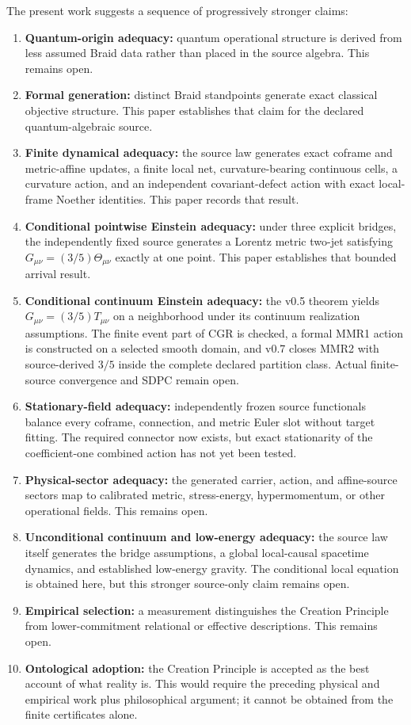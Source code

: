 \documentclass[11pt]{article}
\theoremstyle{definition}
\theoremstyle{remark}
\begin{document}
The present work suggests a sequence of progressively stronger claims:
\begin{enumerate}
\item \textbf{Quantum-origin adequacy:} quantum operational structure is derived from less assumed Braid data rather than placed in the source algebra. This remains open.
\item \textbf{Formal generation:} distinct Braid standpoints generate exact classical objective structure. This paper establishes that claim for the declared quantum-algebraic source.
\item \textbf{Finite dynamical adequacy:} the source law generates exact coframe and metric-affine updates, a finite local net, curvature-bearing continuous cells, a curvature action, and an independent covariant-defect action with exact local-frame Noether identities. This paper records that result.
\item \textbf{Conditional pointwise Einstein adequacy:} under three explicit bridges, the independently fixed source generates a Lorentz metric two-jet satisfying $G_{\mu\nu}=(3/5)\Theta_{\mu\nu}$ exactly at one point. This paper establishes that bounded arrival result.
\item \textbf{Conditional continuum Einstein adequacy:} the v0.5 theorem yields $G_{\mu\nu}=(3/5)T_{\mu\nu}$ on a neighborhood under its continuum realization assumptions. The finite event part of CGR is checked, a formal MMR1 action is constructed on a selected smooth domain, and v0.7 closes MMR2 with source-derived $3/5$ inside the complete declared partition class. Actual finite-source convergence and SDPC remain open.
\item \textbf{Stationary-field adequacy:} independently frozen source functionals balance every coframe, connection, and metric Euler slot without target fitting. The required connector now exists, but exact stationarity of the coefficient-one combined action has not yet been tested.
\item \textbf{Physical-sector adequacy:} the generated carrier, action, and affine-source sectors map to calibrated metric, stress-energy, hypermomentum, or other operational fields. This remains open.
\item \textbf{Unconditional continuum and low-energy adequacy:} the source law itself generates the bridge assumptions, a global local-causal spacetime dynamics, and established low-energy gravity. The conditional local equation is obtained here, but this stronger source-only claim remains open.
\item \textbf{Empirical selection:} a measurement distinguishes the Creation Principle from lower-commitment relational or effective descriptions. This remains open.
\item \textbf{Ontological adoption:} the Creation Principle is accepted as the best account of what reality is. This would require the preceding physical and empirical work plus philosophical argument; it cannot be obtained from the finite certificates alone.
\end{enumerate}
\end{document}
